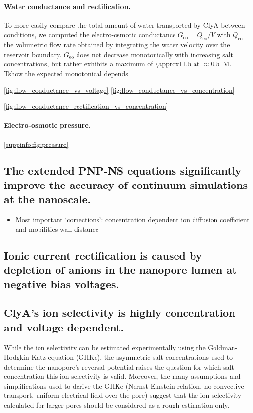 \documentclass[journal=ancac3,manuscript=article,etalmode=truncate,maxauthors=0,layout=twocolumn]{achemso}
\begin{document}
\paragraph{Water conductance and rectification.}
To more easily compare the total amount of water transported by ClyA between conditions, we computed the
electro-osmotic conductance $G_{\text{eo}} = Q_{\text{eo}}/V$ with $Q_{\text{eo}}$ the volumetric flow rate
obtained by integrating the water velocity over the reservoir boundary. 
$G_{\text{eo}}$ does not decrease monotonically with increasing salt concentrations, but rather exhibits a
maximum of \SI{\approx11.5}{\cnmpnspv} at $\approx0.5$~M. Tshow the expected monotonical depends

\cite{Mao-2014,Laohakunakorn-2015}



\cref{fig:flow_conductance_vs_voltage}
\cref{fig:flow_conductance_vs_concentration}


\cref{fig:flow_conductance_rectification_vs_concentration}

\paragraph{Electro-osmotic pressure.}
\cref{suppinfo:fig:pressure}
\cite{Hoogerheide-2014}


\subsection{The extended PNP-NS equations significantly improve the accuracy of continuum simulations at the
nanoscale.}

\begin{itemize}
  \item Most important `corrections':
  \subitem concentration dependent ion diffusion coefficient and mobilities
  \subitem wall distance
\end{itemize}

\subsection{Ionic current rectification is caused by depletion of anions in the nanopore lumen at negative
bias voltages.}

\subsection{ClyA's ion selectivity is highly concentration and voltage dependent.}
While the ion selectivity can be estimated experimentally using the Goldman-Hodgkin-Katz
equation (GHKe),\cite{Franceschini-2016,Huang-2017} the asymmetric salt concentrations used to determine the
nanopore's reversal potential raises the question for which salt concentration this ion selectivity is valid.
Moreover, the many assumptions and simplifications used to derive the GHKe (Nernst-Einstein relation, no
convective transport, uniform electrical field over the pore) suggest that the ion selectivity calculated for
larger pores should be considered as a rough estimation only.
\end{document}
